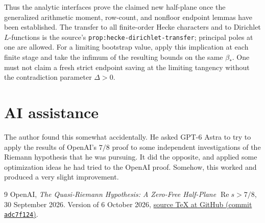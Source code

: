\documentclass[11pt,a4paper]{article}
\numberwithin{equation}{section}
\theoremstyle{remark}
\newcommand{\Rea}{\operatorname{Re}}
\begin{document}
Thus the analytic interfaces prove the claimed new half-plane once the
generalized arithmetic moment, row-count, and nonfloor endpoint lemmas
have been established.  The transfer to all finite-order Hecke
characters and to Dirichlet \(L\)-functions is the source's
\texttt{prop:hecke-dirichlet-transfer}; principal poles at one are allowed.
For a limiting bootstrap value, apply this implication at each finite
stage and take the infimum of the resulting bounds on the same
\(\beta_*\).  One must not claim a fresh strict endpoint saving at the
limiting tangency without the contradiction parameter \(\Delta>0\).

\section*{AI assistance}
The author found this somewhat accidentally. He asked GPT-6 Astra to try
to apply the results of OpenAI's $7/8$ proof to some independent
investigations of the Riemann hypothesis that he was pursuing. It did
the opposite, and applied some optimization ideas he had tried to the
OpenAI proof. Somehow, this worked and produced a very slight
improvement.

\begin{thebibliography}{9}
OpenAI, \emph{The Quasi-Riemann Hypothesis: A Zero-Free Half-Plane
$\Rea s>7/8$}, 30 September 2026. Version of 6 October 2026,
\href{https://github.com/openai/math/blob/adc7f1241b42e322a6451854ab7e4b4c146bf78a/preprints/The-Quasi-Riemann-Hypothesis-September-30-2026/build/paper.tex}{source TeX at GitHub (commit \texttt{adc7f124})}.
\end{thebibliography}
\end{document}
